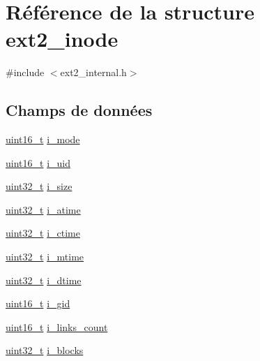 \hypertarget{structext2__inode}{\section{Référence de la structure ext2\-\_\-inode}
\label{structext2__inode}
}


{\ttfamily \#include $<$ext2\-\_\-internal.\-h$>$}

\subsection*{Champs de données}
\begin{DoxyCompactItemize}
\item 
\hyperlink{types_8h_adf4d876453337156dde61095e1f20223}{uint16\-\_\-t} \hyperlink{structext2__inode_ab18d6b6ddb4d36a2faff527b43241126}{i\-\_\-mode}
\item 
\hyperlink{types_8h_adf4d876453337156dde61095e1f20223}{uint16\-\_\-t} \hyperlink{structext2__inode_a082def4b3c1c0c5f9dce1eab8ba51189}{i\-\_\-uid}
\item 
\hyperlink{types_8h_a33594304e786b158f3fb30289278f5af}{uint32\-\_\-t} \hyperlink{structext2__inode_a2b9e2a1c732aa02b5dead0948fb47c72}{i\-\_\-size}
\item 
\hyperlink{types_8h_a33594304e786b158f3fb30289278f5af}{uint32\-\_\-t} \hyperlink{structext2__inode_adb682923fb8b418217d78fd78737406b}{i\-\_\-atime}
\item 
\hyperlink{types_8h_a33594304e786b158f3fb30289278f5af}{uint32\-\_\-t} \hyperlink{structext2__inode_a7d45cc039be5128d9771412191e55544}{i\-\_\-ctime}
\item 
\hyperlink{types_8h_a33594304e786b158f3fb30289278f5af}{uint32\-\_\-t} \hyperlink{structext2__inode_a7eb44698eabf570fee0e65d22cc5fbd1}{i\-\_\-mtime}
\item 
\hyperlink{types_8h_a33594304e786b158f3fb30289278f5af}{uint32\-\_\-t} \hyperlink{structext2__inode_a2a30cea7fb676d2fa5e9f0bd799dfa7c}{i\-\_\-dtime}
\item 
\hyperlink{types_8h_adf4d876453337156dde61095e1f20223}{uint16\-\_\-t} \hyperlink{structext2__inode_af1686b705ca7912d370d12ceaab83b8b}{i\-\_\-gid}
\item 
\hyperlink{types_8h_adf4d876453337156dde61095e1f20223}{uint16\-\_\-t} \hyperlink{structext2__inode_aa6d7753ffe6e8634bafe0b55638ee29a}{i\-\_\-links\-\_\-count}
\item 
\hyperlink{types_8h_a33594304e786b158f3fb30289278f5af}{uint32\-\_\-t} \hyperlink{structext2__inode_a6e5b258ebc92b6ae75c61572c60cbb4b}{i\-\_\-blocks}

\end{DoxyCompactItemize}

